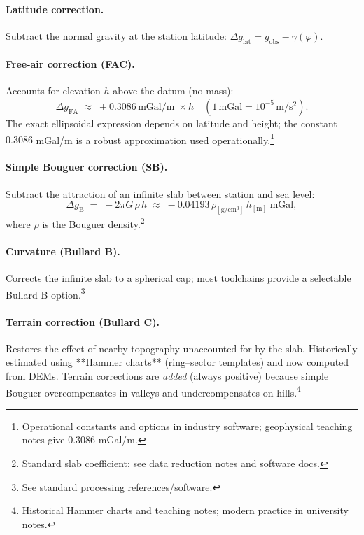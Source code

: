 \documentclass[11pt,a4paper]{article}
\begin{document}
\paragraph{Latitude correction.} Subtract the normal gravity at the station latitude: $\Delta g_{\text{lat}}=g_{\text{obs}}-\gamma(\varphi)$.

\paragraph{Free-air correction (FAC).} Accounts for elevation $h$ above the datum (no mass):
\begin{equation}
  \Delta g_{\text{FA}}\;\approx\;+0.3086\,\text{mGal/m}\;\times h\quad(1\,\text{mGal}=10^{-5}\,\mathrm{m/s^2}).
\end{equation}
The exact ellipsoidal expression depends on latitude and height; the constant $0.3086$ mGal/m is a robust approximation used operationally.\footnote{Operational constants and options in industry software; geophysical teaching notes give $0.3086$ mGal/m.}

\paragraph{Simple Bouguer correction (SB).} Subtract the attraction of an infinite slab between station and sea level:
\begin{equation}
  \Delta g_{\text{B}}\;=\;-2\pi G\,\rho\,h\;\approx\;-0.04193\,\rho_{[\mathrm{g/cm^3}]}\,h_{[\mathrm{m}]}\;\text{mGal},
\end{equation}
where $\rho$ is the Bouguer density.\footnote{Standard slab coefficient; see data reduction notes and software docs.}

\paragraph{Curvature (Bullard B).} Corrects the infinite slab to a spherical cap; most toolchains provide a selectable Bullard B option.\footnote{See standard processing references/software.}

\paragraph{Terrain correction (Bullard C).} Restores the effect of nearby topography unaccounted for by the slab. Historically estimated using **Hammer charts** (ring--sector templates) and now computed from DEMs. Terrain corrections are \emph{added} (always positive) because simple Bouguer overcompensates in valleys and undercompensates on hills.\footnote{Historical Hammer charts and teaching notes; modern practice in university notes.}
\end{document}
